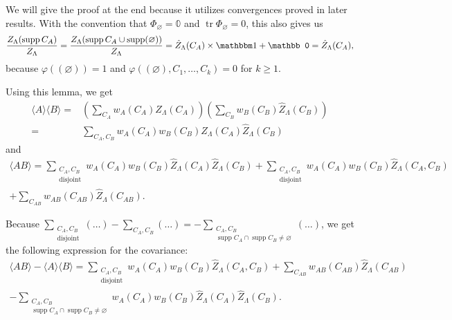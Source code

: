 \documentclass{article}
\DeclareMathOperator{\disj}{disjoint}
\DeclareMathOperator{\tr}{tr}
\DeclareMathOperator{\supp}{supp}
\begin{document}
        We will give the proof at the end because it utilizes convergences proved in later results.
    With the convention that $\Phi_\varnothing=\mathbb 0$ and $\tr \Phi_\varnothing=0$, this also gives us $$
        \frac{Z_\Lambda(\supp C_A)}{Z_\Lambda}=\frac{Z_\Lambda(\supp C_A\cup \supp (\varnothing))}{Z_\Lambda}=\hat Z_\Lambda(C_A)\times\mathbbm 1+ \mathbb 0=\hat Z_\Lambda(C_A),
    $$
    because $\varphi((\varnothing))=1$ and $\varphi((\varnothing),C_1,\ldots,C_k)=0$ for $k\geq 1$.

    
 Using this lemma, we get \begin{align*}
 \langle A\rangle\langle B \rangle =& \left(\sum_{C_A}w_A(C_A)\hat Z_\Lambda(C_A)\right)\left(\sum_{C_B}w_B(C_B)\hat Z_\Lambda(C_B)\right)\\
 =&\sum_{C_A,C_B}w_A(C_A)w_B(C_B)\hat Z_\Lambda(C_A)\hat Z_\Lambda(C_B) 
 \end{align*}
 and 
 \begin{align*}
     \langle AB\rangle =\sum_{\substack{C_A,C_B\\\disj}}w_A(C_A)w_B(C_B)\hat Z_\Lambda(C_A)\hat Z_\Lambda(C_B)+\sum_{\substack{C_A,C_B\\\disj}}w_A(C_A)w_B(C_B)\hat Z_\Lambda(C_A,C_B)&
     \\
     +\sum_{C_{AB}}w_{AB}(C_{AB})\hat Z_{\Lambda}(C_{AB}).&
 \end{align*}
 
 Because $\sum_{\substack{C_A,C_B\\\disj}}(\ldots)-\sum_{C_A,C_B}(\ldots)=-\sum_{\substack{C_A,C_B\\\supp C_A\cap \supp C_B\neq \varnothing}}(\ldots)$,
 we get the following expression for the covariance:
 \begin{align*}
     \langle AB\rangle - \langle A\rangle \langle B\rangle =\sum_{\substack{C_A,C_B\\\disj}}w_A(C_A)w_B(C_B)\hat Z_\Lambda(C_A,C_B)
     +\sum_{C_{AB}}w_{AB}(C_{AB})\hat Z_{\Lambda}(C_{AB})\\
     -\sum_{\substack{C_A,C_B\\\supp C_A\cap \supp C_B\neq \varnothing}}w_A(C_A)w_B(C_B)\hat Z_\Lambda(C_A)\hat Z_\Lambda(C_B).
\end{align*}
\end{document}
